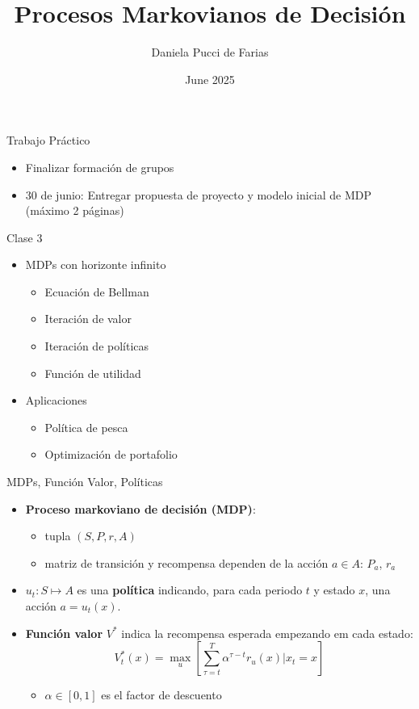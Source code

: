 \documentclass[handout]{beamer}
\title{Procesos Markovianos de Decisión}
\author{Daniela Pucci de Farias}
\institute{Universidad Torcuato Di Tella}
\date{June 2025}
\begin{document}
\frame{\titlepage}

\begin{frame}{Trabajo Práctico}
\begin{itemize}
\item Finalizar formación de grupos
\item 30 de junio: Entregar propuesta de proyecto y modelo inicial de MDP (máximo 2 páginas)
\end{itemize}
\end{frame}

\begin{frame}{Clase 3}
\begin{itemize}
\item MDPs con horizonte infinito
\begin{itemize}
\item Ecuación de Bellman
\item Iteración de valor
\item Iteración de políticas
\item Función de utilidad
\end{itemize}
\item Aplicaciones
\begin{itemize}
\item Política de pesca
\item Optimización de portafolio
\end{itemize}
\end{itemize}
\end{frame}

\begin{frame}{MDPs, Función Valor, Políticas}
\begin{itemize}
\item {\bf Proceso markoviano de decisión (MDP)}:
\begin{itemize}
\item tupla $(S,P,r,A)$
\item<2-> matriz de transición y recompensa dependen de la acción $a \in A$: $P_a$, $r_a$
\end{itemize}
\item<3-> $u_t: S \mapsto A$ es una {\bf política} indicando, para cada periodo $t$ y estado $x$, una acción $a = u_t(x)$.
\item<4-> {\bf Función valor} $V^*$ indica la recompensa esperada empezando em cada estado:
$$
V_t^*(x) = \max_u \left[\sum_{\tau=t}^T \alpha^{\tau-t} r_u(x)|x_t = x\right]
$$
\begin{itemize}
\item $\alpha \in [0,1]$ es el factor de descuento 
\end{itemize}
\end{itemize}    
\end{frame}
\end{document}
